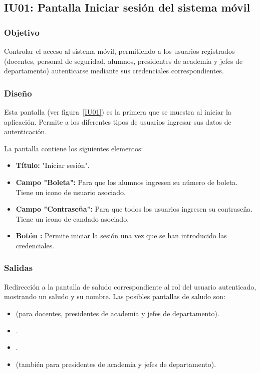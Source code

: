 
\subsection{IU01: Pantalla Iniciar sesión del sistema móvil}


\newpage

\subsubsection{Objetivo}
Controlar el acceso al sistema móvil, permitiendo a los usuarios registrados (docentes, personal de seguridad, alumnos, presidentes de academia y jefes de departamento) autenticarse mediante sus credenciales correspondientes.

\subsubsection{Diseño}
Esta pantalla  (ver figura~\ref{IU01}) es la primera que se muestra al iniciar la aplicación. Permite a los diferentes tipos de usuarios ingresar sus datos de autenticación.



La pantalla contiene los siguientes elementos:
\begin{itemize}
	\item \textbf{Título:} "Iniciar sesión".
	\item \textbf{Campo "Boleta":} Para que los alumnos ingresen su número de boleta. Tiene un icono de usuario asociado.
	\item \textbf{Campo "Contraseña":} Para que todos los usuarios ingresen su contraseña. Tiene un icono de candado asociado.
	\item \textbf{Botón :} Permite iniciar la sesión una vez que se han introducido las credenciales.
\end{itemize}

\subsubsection{Salidas}
Redirección a la pantalla de saludo correspondiente al rol del usuario autenticado, mostrando un saludo y su nombre. Las posibles pantallas de saludo son:
\begin{itemize}
	\item {} (para docentes, presidentes de academia y jefes de departamento).
	\item {}.
	\item {}.
	\item {} (también para presidentes de academia y jefes de departamento).
\end{itemize}

